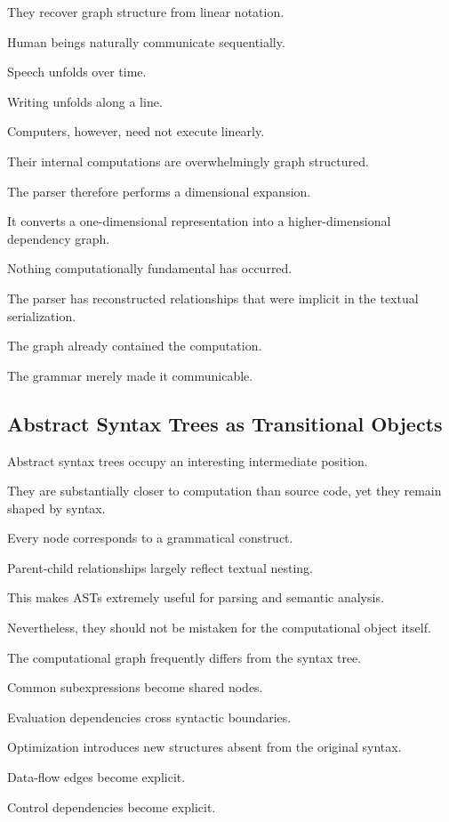 \documentclass[12pt,oneside]{article}
\begin{document}
They recover graph structure from linear notation.

Human beings naturally communicate sequentially.

Speech unfolds over time.

Writing unfolds along a line.

Computers, however, need not execute linearly.

Their internal computations are overwhelmingly graph structured.

The parser therefore performs a dimensional expansion.

It converts a one-dimensional representation into a higher-dimensional dependency graph.

Nothing computationally fundamental has occurred.

The parser has reconstructed relationships that were implicit in the textual serialization.

The graph already contained the computation.

The grammar merely made it communicable.

\subsection{Abstract Syntax Trees as Transitional Objects}

Abstract syntax trees occupy an interesting intermediate position.

They are substantially closer to computation than source code, yet they remain shaped by syntax.

Every node corresponds to a grammatical construct.

Parent-child relationships largely reflect textual nesting.

This makes ASTs extremely useful for parsing and semantic analysis.

Nevertheless, they should not be mistaken for the computational object itself.

The computational graph frequently differs from the syntax tree.

Common subexpressions become shared nodes.

Evaluation dependencies cross syntactic boundaries.

Optimization introduces new structures absent from the original syntax.

Data-flow edges become explicit.

Control dependencies become explicit.
\end{document}
